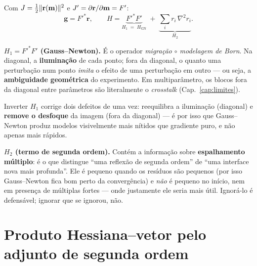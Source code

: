 \documentclass[11pt,a4paper,oneside]{report}
\begin{document}
Com $J = \tfrac12\lVert \mathbf{r}(\mathbf{m}) \rVert^{2}$ e $J' = \partial\mathbf{r}/
\partial\mathbf{m} = F'$:
\begin{equation}
\mathbf{g} = F'^{*}\mathbf{r},
\qquad
H = \underbrace{F'^{*}F'}_{H_1 \;=\; H_{\text{GN}}}
  \;+\; \underbrace{\sum_i r_i\,\nabla^{2} r_i}_{H_2} .
\label{eq:hess3}
\end{equation}

\begin{teoria}
\textbf{$H_1 = F'^{*}F'$ (Gauss--Newton).} \'E o operador
\emph{migra\c{c}\~ao $\circ$ modelagem de Born}. Na diagonal, a
\textbf{ilumina\c{c}\~ao} de cada ponto; fora da diagonal, o quanto uma
perturba\c{c}\~ao num ponto \emph{imita} o efeito de uma perturba\c{c}\~ao em
outro --- ou seja, a \textbf{ambiguidade geom\'etrica} do experimento. Em
multipar\^ametro, os blocos fora da diagonal entre par\^ametros s\~ao
literalmente o \emph{crosstalk} (Cap.~\ref{cap:limites}).

Inverter $H_1$ corrige dois defeitos de uma vez: reequilibra a ilumina\c{c}\~ao
(diagonal) e \textbf{remove o desfoque} da imagem (fora da diagonal) --- \'e por isso
que Gauss--Newton produz modelos visivelmente mais n\'itidos que gradiente
puro, e n\~ao apenas mais r\'apidos.

\textbf{$H_2$ (termo de segunda ordem).} Cont\'em a informa\c{c}\~ao sobre
\textbf{espalhamento m\'ultiplo}: \'e o que distingue ``uma reflex\~ao de
segunda ordem'' de ``uma interface nova mais profunda''. Ele \'e pequeno
quando os res\'iduos s\~ao pequenos (por isso Gauss--Newton fica bom perto da
converg\^encia) e \emph{n\~ao} \'e pequeno no in\'icio, nem em presen\c{c}a de
m\'ultiplas fortes --- onde justamente ele seria mais \'util. Ignor\'a-lo \'e
defens\'avel; ignorar que se ignorou, n\~ao.
\end{teoria}

\section{Produto Hessiana--vetor pelo adjunto de segunda ordem}
\end{document}
